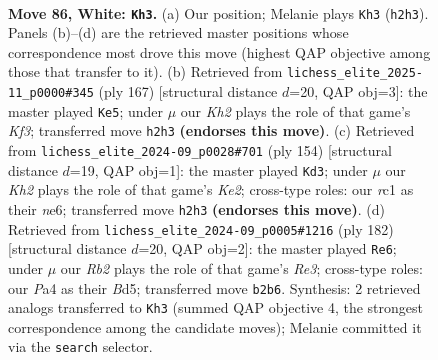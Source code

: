 \documentclass[11pt]{article}
\begin{document}
\clearpage

\begin{figure}[p]\centering
\begin{subfigure}{0.46\textwidth}\centering
\resizebox{\linewidth}{!}{%
\newchessgame
\chessboard[
  setfen={8/5pk1/4p3/R7/P3P3/5P2/1R5K/2r5 w - - 63 86},
  showmover=false,
  pgfstyle=straightmove, color=movearrow, markmove={h2-h3}
]}
\caption{}
\end{subfigure}\hfill
\begin{subfigure}{0.46\textwidth}\centering
\resizebox{\linewidth}{!}{%
\newchessgame
\chessboard[
  setfen={8/8/r4kp1/7p/7P/5KP1/p7/R7 b - - 7 84},
  showmover=false,
  pgfstyle=straightmove, color=movearrow, markmove={f6-e5}
]}
\caption{}
\end{subfigure}
\\[4pt]
\begin{subfigure}{0.46\textwidth}\centering
\resizebox{\linewidth}{!}{%
\newchessgame
\chessboard[
  setfen={8/5p1k/4n1p1/8/6Pp/4R2P/4K3/8 w - - 6 78},
  showmover=false,
  pgfstyle=straightmove, color=movearrow, markmove={e2-d3}
]}
\caption{}
\end{subfigure}\hfill
\begin{subfigure}{0.46\textwidth}\centering
\resizebox{\linewidth}{!}{%
\newchessgame
\chessboard[
  setfen={5k2/8/1r4p1/3B2Pp/7P/4R1K1/8/8 w - - 13 92},
  showmover=false,
  pgfstyle=straightmove, color=movearrow, markmove={e3-e6}
]}
\caption{}
\end{subfigure}
\caption{\textbf{Move 86, White: \texttt{Kh3}.} (a) Our position; Melanie plays \texttt{Kh3} (\texttt{h2h3}). Panels (b)--(d) are the retrieved master positions whose correspondence most drove this move (highest QAP objective among those that transfer to it). (b) Retrieved from \texttt{lichess\_elite\_2025-11\_p0000\#345} (ply 167) [structural distance $d$=20, QAP obj=3]: the master played \texttt{Ke5}; under $\mu$ our \emph{Kh2} plays the role of that game's \emph{Kf3}; transferred move \texttt{h2h3} \textbf{(endorses this move)}. (c) Retrieved from \texttt{lichess\_elite\_2024-09\_p0028\#701} (ply 154) [structural distance $d$=19, QAP obj=1]: the master played \texttt{Kd3}; under $\mu$ our \emph{Kh2} plays the role of that game's \emph{Ke2}; cross-type roles: our \emph{r}c1 as their \emph{n}e6; transferred move \texttt{h2h3} \textbf{(endorses this move)}. (d) Retrieved from \texttt{lichess\_elite\_2024-09\_p0005\#1216} (ply 182) [structural distance $d$=20, QAP obj=2]: the master played \texttt{Re6}; under $\mu$ our \emph{Rb2} plays the role of that game's \emph{Re3}; cross-type roles: our \emph{P}a4 as their \emph{B}d5; transferred move \texttt{b2b6}. Synthesis: 2 retrieved analogs transferred to \texttt{Kh3} (summed QAP objective 4, the strongest correspondence among the candidate moves); Melanie committed it via the \texttt{search} selector.}
\label{fig:thought-m170}
\end{figure}
\end{document}
